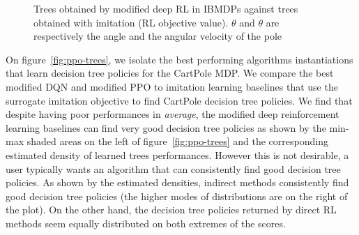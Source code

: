 \begin{figure}
    \caption{Trees obtained by modified deep RL in IBMDPs against trees obtained with imitation (RL objective value). $\theta$ and $\dot{\theta}$ are respectively the angle and the angular velocity of the pole}
    \label{fig:trees-drl}
\end{figure}


On figure~\ref{fig:ppo-trees}, we isolate the best performing algorithms instantiations that learn decision tree policies for the CartPole MDP.
We compare the best modified DQN and modified PPO to imitation learning baselines that use the surrogate imitation objective to find CartPole decision tree policies.
We find that despite having poor performances in \textit{average}, the modified deep reinforcement learning baselines can find very good decision tree policies as shown by the min-max shaded areas on the left of figure~\ref{fig:ppo-trees} and the corresponding estimated density of learned trees performances.
However this is not desirable, a user typically wants an algorithm that can consistently find good decision tree policies.
As shown by the estimated densities, indirect methods consistently find good decision tree policies (the higher modes of distributions are on the right of the plot).
On the other hand, the decision tree policies returned by direct RL methods seem equally distributed on both extremes of the scores.

